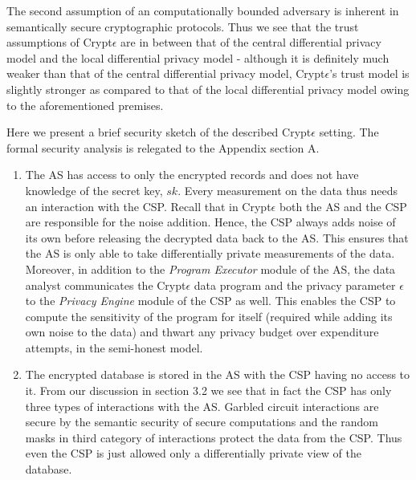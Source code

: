 The second assumption of an computationally bounded adversary is inherent in semantically secure cryptographic protocols. Thus we see that the trust assumptions of Crypt$\epsilon$ are in between that of the central differential privacy model and the local differential privacy model - although it is definitely much weaker than that of the central differential privacy model, Crypt$\epsilon$'s trust model is slightly stronger as compared to that of the local differential privacy model owing to the aforementioned premises. \par Here we present a brief security sketch of the described Crypt$\epsilon$ setting. The formal security analysis is relegated to the Appendix section A.  \begin{enumerate}\item The \textsf{AS} has access to only the encrypted records and does not have knowledge of the secret key, $sk$. Every measurement on the data thus needs an interaction with the \textsf{CSP}. Recall that in Crypt$\epsilon$ both the \textsf{AS} and the \textsf{CSP} are responsible for the noise addition.  Hence, the \textsf{CSP} always adds noise of its own before releasing the decrypted
data back to the \textsf{AS}. This ensures that the \textsf{AS} is only able to take differentially private measurements of the data.  Moreover, in addition to the \textit{Program Executor} module of the \textsf{AS}, the data analyst communicates the Crypt$\epsilon$ data program and the privacy parameter $\epsilon$ to the \textit{Privacy Engine} module of the \textsf{CSP} as well. This enables the \textsf{CSP} to compute the sensitivity  of the program for itself (required while adding its own noise to the data) and thwart any privacy budget over expenditure attempts, in the semi-honest model. 
\item The encrypted database is stored in the \textsf{AS} with the \textsf{CSP} having no access to it. From our discussion in section 3.2 we see that in fact the \textsf{CSP} has only three types of interactions with the \textsf{AS}. Garbled circuit interactions are secure by the semantic security of secure computations and the random masks in  third category of interactions protect the data from the \textsf{CSP}. Thus even the \textsf{CSP} is just allowed only a differentially private view of the database. \end{enumerate}
